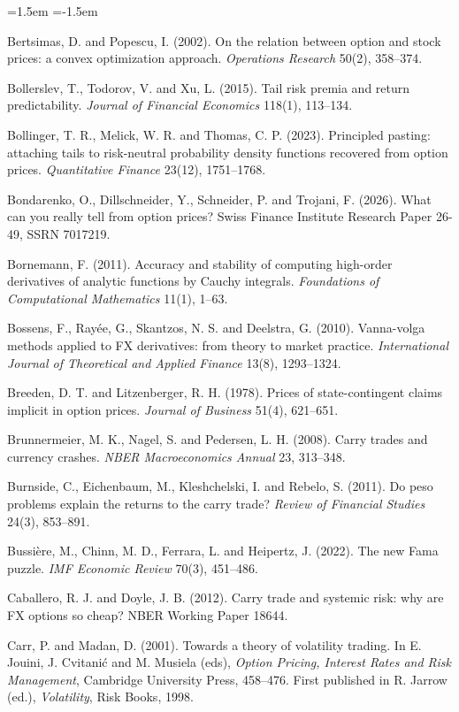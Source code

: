 \documentclass[11pt]{article}
\theoremstyle{result}
\begin{document}
\begin{list}{}{\leftmargin=1.5em \itemindent=-1.5em \itemsep=2pt \parsep=0pt}
\item Bertsimas, D. and Popescu, I. (2002). On the relation between option and stock prices: a convex optimization approach. \emph{Operations Research} 50(2), 358--374.
\item Bollerslev, T., Todorov, V. and Xu, L. (2015). Tail risk premia and return predictability. \emph{Journal of Financial Economics} 118(1), 113--134.
\item Bollinger, T. R., Melick, W. R. and Thomas, C. P. (2023). Principled pasting: attaching tails to risk-neutral probability density functions recovered from option prices. \emph{Quantitative Finance} 23(12), 1751--1768.
\item Bondarenko, O., Dillschneider, Y., Schneider, P. and Trojani, F. (2026). What can you really tell from option prices? Swiss Finance Institute Research Paper 26-49, SSRN 7017219.
\item Bornemann, F. (2011). Accuracy and stability of computing high-order derivatives of analytic functions by Cauchy integrals. \emph{Foundations of Computational Mathematics} 11(1), 1--63.
\item Bossens, F., Ray\'ee, G., Skantzos, N. S. and Deelstra, G. (2010). Vanna-volga methods applied to FX derivatives: from theory to market practice. \emph{International Journal of Theoretical and Applied Finance} 13(8), 1293--1324.
\item Breeden, D. T. and Litzenberger, R. H. (1978). Prices of state-contingent claims implicit in option prices. \emph{Journal of Business} 51(4), 621--651.
\item Brunnermeier, M. K., Nagel, S. and Pedersen, L. H. (2008). Carry trades and currency crashes. \emph{NBER Macroeconomics Annual} 23, 313--348.
\item Burnside, C., Eichenbaum, M., Kleshchelski, I. and Rebelo, S. (2011). Do peso problems explain the returns to the carry trade? \emph{Review of Financial Studies} 24(3), 853--891.
\item Bussi\`ere, M., Chinn, M. D., Ferrara, L. and Heipertz, J. (2022). The new Fama puzzle. \emph{IMF Economic Review} 70(3), 451--486.
\item Caballero, R. J. and Doyle, J. B. (2012). Carry trade and systemic risk: why are FX options so cheap? NBER Working Paper 18644.
\item Carr, P. and Madan, D. (2001). Towards a theory of volatility trading. In E. Jouini, J. Cvitani\'c and M. Musiela (eds), \emph{Option Pricing, Interest Rates and Risk Management}, Cambridge University Press, 458--476. First published in R. Jarrow (ed.), \emph{Volatility}, Risk Books, 1998.

\end{list}
\end{document}
